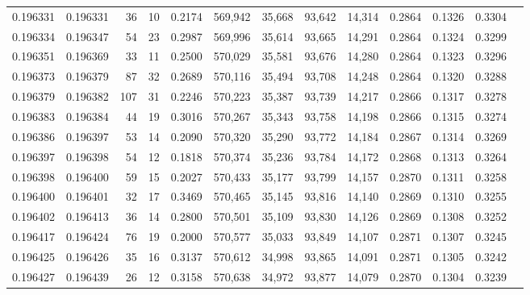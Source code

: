 \begin{tabular}{rrrrrrrrrrrrr}
0.196331 & 0.196331 &    36 &  10 &                                     0.2174 & 569,942 &  35,668 &  93,642 &  14,314 & 0.2864 & 0.1326 & 0.3304 \\
0.196334 & 0.196347 &    54 &  23 &                                     0.2987 & 569,996 &  35,614 &  93,665 &  14,291 & 0.2864 & 0.1324 & 0.3299 \\
0.196351 & 0.196369 &    33 &  11 &                                     0.2500 & 570,029 &  35,581 &  93,676 &  14,280 & 0.2864 & 0.1323 & 0.3296 \\
0.196373 & 0.196379 &    87 &  32 &                                     0.2689 & 570,116 &  35,494 &  93,708 &  14,248 & 0.2864 & 0.1320 & 0.3288 \\
0.196379 & 0.196382 &   107 &  31 &                                     0.2246 & 570,223 &  35,387 &  93,739 &  14,217 & 0.2866 & 0.1317 & 0.3278 \\
0.196383 & 0.196384 &    44 &  19 &                                     0.3016 & 570,267 &  35,343 &  93,758 &  14,198 & 0.2866 & 0.1315 & 0.3274 \\
0.196386 & 0.196397 &    53 &  14 &                                     0.2090 & 570,320 &  35,290 &  93,772 &  14,184 & 0.2867 & 0.1314 & 0.3269 \\
0.196397 & 0.196398 &    54 &  12 &                                     0.1818 & 570,374 &  35,236 &  93,784 &  14,172 & 0.2868 & 0.1313 & 0.3264 \\
0.196398 & 0.196400 &    59 &  15 &                                     0.2027 & 570,433 &  35,177 &  93,799 &  14,157 & 0.2870 & 0.1311 & 0.3258 \\
0.196400 & 0.196401 &    32 &  17 &                                     0.3469 & 570,465 &  35,145 &  93,816 &  14,140 & 0.2869 & 0.1310 & 0.3255 \\
0.196402 & 0.196413 &    36 &  14 &                                     0.2800 & 570,501 &  35,109 &  93,830 &  14,126 & 0.2869 & 0.1308 & 0.3252 \\
0.196417 & 0.196424 &    76 &  19 &                                     0.2000 & 570,577 &  35,033 &  93,849 &  14,107 & 0.2871 & 0.1307 & 0.3245 \\
0.196425 & 0.196426 &    35 &  16 &                                     0.3137 & 570,612 &  34,998 &  93,865 &  14,091 & 0.2871 & 0.1305 & 0.3242 \\
0.196427 & 0.196439 &    26 &  12 &                                     0.3158 & 570,638 &  34,972 &  93,877 &  14,079 & 0.2870 & 0.1304 & 0.3239 \\

\end{tabular}
